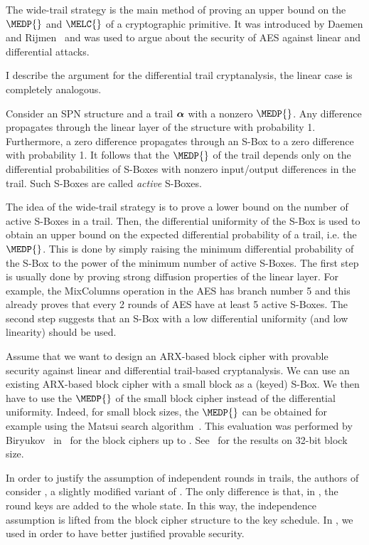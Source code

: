 The wide-trail strategy is the main method of proving an upper bound on the $\MEDP{}$ and $\MELC{}$ of a cryptographic primitive. It was introduced by Daemen and Rijmen~\cite{WideTrail} and was used to argue about the security of AES against linear and differential attacks.

I describe the argument for the differential trail cryptanalysis, the linear case is completely analogous.

Consider an SPN structure and a trail $\boldsymbol{\alpha}$ with a nonzero $\MEDP{}$. Any difference propagates through the linear layer of the structure with probability 1. Furthermore, a zero difference propagates through an S-Box to a zero difference with probability 1. It follows that the $\MEDP{}$ of the trail depends only on the differential probabilities of S-Boxes with nonzero input/output differences in the trail. Such S-Boxes are called \emph{active} S-Boxes. 

The idea of the wide-trail strategy is to prove a lower bound on the number of active S-Boxes in a trail. Then, the differential uniformity of the S-Box is used to obtain an upper bound on the expected differential probability of a trail, i.e. the $\MEDP{}$. This is done by simply raising the minimum differential probability of the S-Box to the power of the minimum number of active S-Boxes.
The first step is usually done by proving strong diffusion properties of the linear layer. For example, the MixColumns operation in the AES has branch number 5 and this already proves that every 2 rounds of AES have at least 5 active S-Boxes. The second step suggests that an S-Box with a low differential uniformity (and low linearity) should be used.

Assume that we want to design an ARX-based block cipher with provable security against linear and differential trail-based cryptanalysis. We can use an existing ARX-based block cipher with a small block as a (keyed) S-Box. We then have to use the $\MEDP{}$ of the small block cipher instead of the differential uniformity. Indeed, for small block sizes, the $\MEDP{}$ can be obtained for example using the Matsui search algorithm~\cite{MatsuiAlgo}. This evaluation was performed by Biryukov~\etal{} in~\cite{BVL16} for the block ciphers  up to . See~ for the results on 32-bit block size.

\begin{remark}
In order to justify the assumption of independent rounds in trails, the authors of~\cite{BVL16} consider \speckey{}, a slightly modified variant of . The only difference is that, in \speckey{}, the round keys are added to the whole state. In this way, the independence assumption is lifted from the block cipher structure to the key schedule. In \sparx{}, we used \speckey{} in order to have better justified provable security.
\end{remark}

